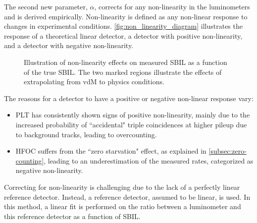 {The second new parameter, \(\alpha\), corrects for any non-linearity in the luminometers and is derived empirically. Non-linearity is defined as any non-linear response to changes in experimental conditions. \autoref{fig:non_linearity_diagram} illustrates the response of a theoretical linear detector, a detector with positive non-linearity, and a detector with negative non-linearity.

\begin{figure}[!htb]
    \centering
    \caption[Non-linearity effects on SBIL]{Illustration of non-linearity effects on measured SBIL as a function of the true SBIL. The two marked regions illustrate the effects of extrapolating from vdM to physics conditions.}
    \label{fig:non_linearity_diagram}
\end{figure}

The reasons for a detector to have a positive or negative non-linear response vary:

\begin{itemize}
    \item PLT has consistently shown signs of positive non-linearity, mainly due to the increased probability of ``accidental" triple coincidences at higher pileup due to background tracks, leading to overcounting.
    \item HFOC suffers from the ``zero starvation" effect, as explained in \autoref{subsec:zero-counting}, leading to an underestimation of the measured rates, categorized as negative non-linearity.
\end{itemize}

Correcting for non-linearity is challenging due to the lack of a perfectly linear reference detector. Instead, a reference detector, assumed to be linear, is used. In this method, a linear fit is performed on the ratio between a luminometer and this reference detector as a function of SBIL. 

}
